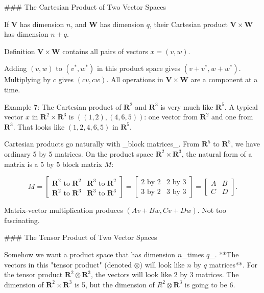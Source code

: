 

### The Cartesian Product of Two Vector Spaces

If \(\mathbf{V}\) has dimension \(n\), and \(\mathbf{W}\) has dimension \(q\), their Cartesian product \(\mathbf{V}\times\mathbf{W}\) has dimension \(n+q\).

Definition \(\mathbf{V}\times\mathbf{W}\) contains all pairs of vectors \(x=(v,w)\).

Adding \((v,w)\) to \((v^{*},w^{*})\) in this product space gives \((v+v^{*},w+w^{*})\). Multiplying by \(c\) gives \((cv,cw)\). All operations in \(\mathbf{V}\times\mathbf{W}\) are a component at a time.

Example 7: The Cartesian product of \(\mathbf{R}^{2}\) and \(\mathbf{R}^{3}\) is very much like \(\mathbf{R}^{5}\). A typical vector \(x\) in \(\mathbf{R}^{2}\times\mathbf{R}^{3}\) is \(((1,2),(4,6,5))\): one vector from \(\mathbf{R}^{2}\) and one from \(\mathbf{R}^{3}\). That looks like \((1,2,4,6,5)\) in \(\mathbf{R}^{5}\).

Cartesian products go naturally with _block matrices_. From \(\mathbf{R}^{5}\) to \(\mathbf{R}^{5}\), we have ordinary 5 by 5 matrices. On the product space \(\mathbf{R}^{2}\times\mathbf{R}^{3}\), the natural form of a matrix is a 5 by 5 block matrix \(M\):

\[M=\begin{bmatrix}\mathbf{R}^{2}\text{ to }\mathbf{R}^{2}&\mathbf{R}^{3}\text{ to }\mathbf{R}^{2}\\ \mathbf{R}^{2}\text{ to }\mathbf{R}^{3}&\mathbf{R}^{3}\text{ to }\mathbf{R}^{3}\end{bmatrix}= \begin{bmatrix}2\text{ by }2&2\text{ by }3\\ 3\text{ by }2&3\text{ by }3\end{bmatrix}=\begin{bmatrix}A&B\\ C&D\end{bmatrix}.\]

Matrix-vector multiplication produces \((Av+Bw,Cv+Dw)\). Not too fascinating.

### The Tensor Product of Two Vector Spaces

Somehow we want a product space that has dimension \(n\)_times \(q\)_. **The vectors in this "tensor product" (denoted \(\otimes\)) will look like \(n\) by \(q\) matrices**. For the tensor product \(\mathbf{R}^{2}\otimes\mathbf{R}^{3}\), the vectors will look like 2 by 3 matrices. The dimension of \(\mathbf{R}^{2}\times\mathbf{R}^{3}\) is 5, but the dimension of \(R^{2}\otimes\mathbf{R}^{3}\) is going to be 6.

